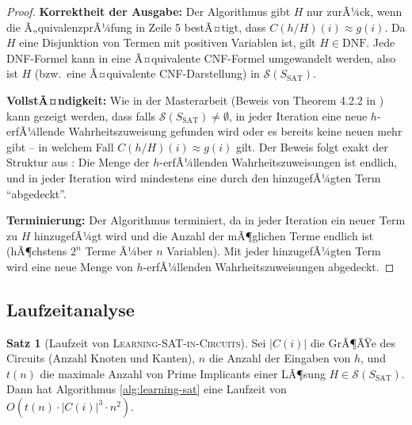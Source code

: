 ﻿\documentclass[a4paper,12pt]{article}
\theoremstyle{definition}
\newtheorem{satz}{Satz}
\begin{document}
\begin{proof}
    \textbf{Korrektheit der Ausgabe:} Der Algorithmus gibt $H$ nur zurÃ¼ck, wenn die Ã„quivalenzprÃ¼fung in Zeile 5 bestÃ¤tigt, dass $C(h/H)(i) \approx g(i)$. Da $H$ eine Disjunktion von Termen mit positiven Variablen ist, gilt $H \in \text{DNF}$. Jede DNF-Formel kann in eine Ã¤quivalente CNF-Formel umgewandelt werden, also ist $H$ (bzw.\ eine Ã¤quivalente CNF-Darstellung) in $\mathcal{S}(S_{\text{SAT}})$.
    
    \textbf{VollstÃ¤ndigkeit:} Wie in der Masterarbeit (Beweis von Theorem 4.2.2 in \cite{Epp13}) kann gezeigt werden, dass falls $\mathcal{S}(S_{\text{SAT}}) \neq \emptyset$, in jeder Iteration eine neue $h$-erfÃ¼llende Wahrheitszuweisung gefunden wird oder es bereits keine neuen mehr gibt -- in welchem Fall $C(h/H)(i) \approx g(i)$ gilt. Der Beweis folgt exakt der Struktur aus \cite{Epp13}: Die Menge der $h$-erfÃ¼llenden Wahrheitszuweisungen ist endlich, und in jeder Iteration wird mindestens eine durch den hinzugefÃ¼gten Term ``abgedeckt''.
    
    \textbf{Terminierung:} Der Algorithmus terminiert, da in jeder Iteration ein neuer Term zu $H$ hinzugefÃ¼gt wird und die Anzahl der mÃ¶glichen Terme endlich ist (hÃ¶chstens $2^n$ Terme Ã¼ber $n$ Variablen). Mit jeder hinzugefÃ¼gten Term wird eine neue Menge von $h$-erfÃ¼llenden Wahrheitszuweisungen abgedeckt.
\end{proof}

\subsection{Laufzeitanalyse}

\begin{satz}[Laufzeit von \textsc{Learning-SAT-in-Circuits}]
    Sei $|C(i)|$ die GrÃ¶ÃŸe des Circuits (Anzahl Knoten und Kanten), $n$ die Anzahl der Eingaben von $h$, und $t(n)$ die maximale Anzahl von Prime Implicants einer LÃ¶sung $H \in \mathcal{S}(S_{\text{SAT}})$. Dann hat Algorithmus \ref{alg:learning-sat} eine Laufzeit von $O(t(n) \cdot |C(i)|^3 \cdot n^2)$.
\end{satz}
\end{document}

